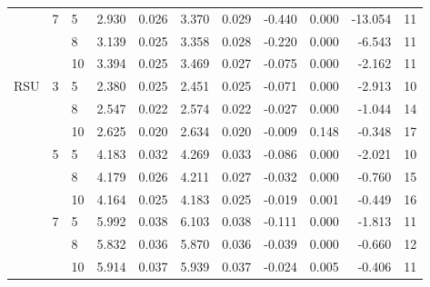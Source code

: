 \begin{tabular}{lllrrrrrrrr}
    & 7 & 5  &    2.930 &     0.026 &  3.370 &     0.029 &     -0.440 &   0.000 &   -13.054 &  11 \\
    &   & 8  &    3.139 &     0.025 &  3.358 &     0.028 &     -0.220 &   0.000 &    -6.543 &  11 \\
    &   & 10 &    3.394 &     0.025 &  3.469 &     0.027 &     -0.075 &   0.000 &    -2.162 &  11 \\
RSU & 3 & 5  &    2.380 &     0.025 &  2.451 &     0.025 &     -0.071 &   0.000 &    -2.913 &  10 \\
    &   & 8  &    2.547 &     0.022 &  2.574 &     0.022 &     -0.027 &   0.000 &    -1.044 &  14 \\
    &   & 10 &    2.625 &     0.020 &  2.634 &     0.020 &     -0.009 &   0.148 &    -0.348 &  17 \\
    & 5 & 5  &    4.183 &     0.032 &  4.269 &     0.033 &     -0.086 &   0.000 &    -2.021 &  10 \\
    &   & 8  &    4.179 &     0.026 &  4.211 &     0.027 &     -0.032 &   0.000 &    -0.760 &  15 \\
    &   & 10 &    4.164 &     0.025 &  4.183 &     0.025 &     -0.019 &   0.001 &    -0.449 &  16 \\
    & 7 & 5  &    5.992 &     0.038 &  6.103 &     0.038 &     -0.111 &   0.000 &    -1.813 &  11 \\
    &   & 8  &    5.832 &     0.036 &  5.870 &     0.036 &     -0.039 &   0.000 &    -0.660 &  12 \\
    &   & 10 &    5.914 &     0.037 &  5.939 &     0.037 &     -0.024 &   0.005 &    -0.406 &  11 \\
\bottomrule
\end{tabular}
